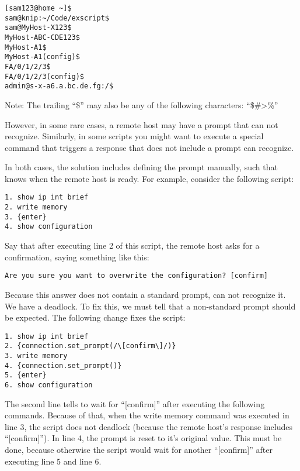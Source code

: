 \begin{lstlisting}
[sam123@home ~]$
sam@knip:~/Code/exscript$
sam@MyHost-X123$
MyHost-ABC-CDE123$
MyHost-A1$
MyHost-A1(config)$
FA/0/1/2/3$
FA/0/1/2/3(config)$
admin@s-x-a6.a.bc.de.fg:/$
\end{lstlisting}

Note: The trailing ``\$'' may also be any of the following characters: ``\$\#>\%''

However, in some rare cases, a remote host may have a prompt that \product 
can not recognize. Similarly, in some scripts you might want to execute a 
special command that triggers a response that does not include a prompt 
\product can recognize.

In both cases, the solution includes defining the prompt manually, such 
that \product knows when the remote host is ready. For example, consider 
the following script: 

\begin{lstlisting}
1. show ip int brief
2. write memory
3. {enter}
4. show configuration
\end{lstlisting}

Say that after executing line 2 of this script, the remote host asks for a 
confirmation, saying something like this: 

\begin{lstlisting}
Are you sure you want to overwrite the configuration? [confirm]
\end{lstlisting}

Because this answer does not contain a standard prompt, \product can not 
recognize it. We have a deadlock. To fix this, we must tell \product that 
a non-standard prompt should be expected. The following change fixes the 
script: 

\begin{lstlisting}
1. show ip int brief
2. {connection.set_prompt(/\[confirm\]/)}
3. write memory
4. {connection.set_prompt()}
5. {enter}
6. show configuration
\end{lstlisting}

The second line tells \product to wait for ``[confirm]'' after executing 
the following commands. Because of that, when the write memory command was 
executed in line 3, the script does not deadlock (because the remote host's 
response includes ``[confirm]''). In line 4, the prompt is reset to it's 
original value. This must be done, because otherwise the script would wait 
for another ``[confirm]'' after executing line 5 and line 6. 


